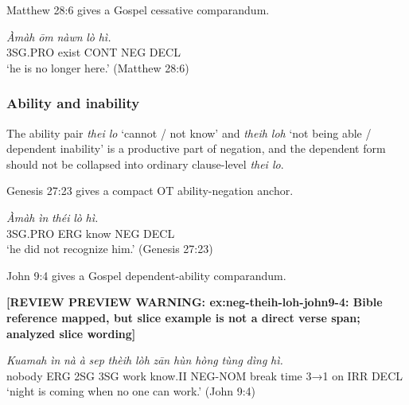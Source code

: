 \documentclass[
  11pt,
  a4paper,
]{article}
\newcommand{\tdim}[1]{\textit{#1}}
\newcommand{\tdimword}[1]{\textit{#1}}
\renewcommand{\textsc}[1]{{\footnotesize\MakeUppercase{#1}}}
\newcommand{\glossquote}[1]{`#1'}
\newcommand{\reviewwarninginline}[1]{\textbf{#1}\par\smallskip}
\begin{document}
Matthew 28:6 gives a Gospel cessative comparandum.

\begin{exe}
\ex \label{ex:neg-nawn-lo-matt28-6}
\gll \tdimword{Àmàh} \tdimword{ōm} \tdimword{nàwn} \tdimword{lò} \tdimword{hì.} \\
     \textsc{3sg}.\textsc{pro} exist \textsc{cont} \textsc{neg} \textsc{decl} \\
\glt \glossquote{he is no longer here.} (Matthew 28:6)
\end{exe}

\subsubsection{Ability and inability}\label{ability-and-inability}

The ability pair \tdim{thei lo} \glossquote{cannot / not know} and
\tdim{theih loh} \glossquote{not being able / dependent inability} is a
productive part of negation, and the dependent form should not be
collapsed into ordinary clause-level \tdim{thei lo}.

Genesis 27:23 gives a compact OT ability-negation anchor.

\begin{exe}
\ex \label{ex:neg-thei-lo}
\gll \tdimword{Àmàh} \tdimword{ìn} \tdimword{théi} \tdimword{lò} \tdimword{hì.} \\
     \textsc{3sg}.\textsc{pro} \textsc{erg} know \textsc{neg} \textsc{decl} \\
\glt \glossquote{he did not recognize him.} (Genesis 27:23)
\end{exe}

John 9:4 gives a Gospel dependent-ability comparandum.

\begin{exe}
\ex \label{ex:neg-theih-loh-john9-4}
\reviewwarninginline{[REVIEW PREVIEW WARNING: ex:neg-theih-loh-john9-4: Bible reference mapped, but slice example is not a direct verse span; analyzed slice wording]}
\gll \tdimword{Kuamah} \tdimword{ìn} \tdimword{nà} \tdimword{à} \tdimword{sep} \tdimword{thèih} \tdimword{lòh} \tdimword{zān} \tdimword{hùn} \tdimword{hòng} \tdimword{tùng} \tdimword{dìng} \tdimword{hì.} \\
     nobody \textsc{erg} \textsc{2sg} \textsc{3sg} work know.\textsc{ii} \textsc{neg}-\textsc{nom} break time \textsc{3→1} on \textsc{irr} \textsc{decl} \\
\glt \glossquote{night is coming when no one can work.} (John 9:4)
\end{exe}
\end{document}
